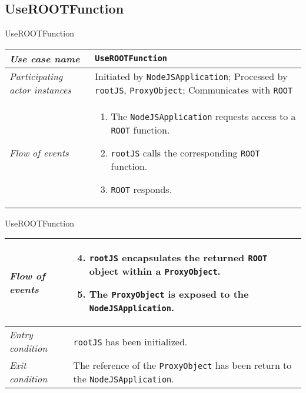 \subsection{UseROOTFunction}
\begin{frame}{UseROOTFunction}
        \begin{longtable}{p{3cm} @{\hskip 1cm} p{7cm}}
                \hline

                \textit{Use case name} & \texttt{UseROOTFunction}\\
                \hline

                \textit{Participating actor instances} & Initiated by \texttt{NodeJSApplication}; Processed by \texttt{rootJS}, \texttt{ProxyObject}; Communicates with \texttt{ROOT}\\
                \hline

                \textit{Flow of events} &
                        \begin{enumerate}
                                \item The \texttt{NodeJSApplication} requests access to a \texttt{ROOT} function.
                                \item \texttt{rootJS} calls the corresponding \texttt{ROOT} function.
                                \item \texttt{ROOT} responds.
                        \end{enumerate}
                        \\
        \end{longtable}
\end{frame}
\begin{frame}[t]{UseROOTFunction}
        \begin{longtable}{p{3cm} @{\hskip 1cm} p{7cm}}
                \textit{Flow of events} &
                        \begin{enumerate}
                                \setcounter{enumi}{3}
                                \item \texttt{rootJS} encapsulates the returned \texttt{ROOT} object within a \texttt{ProxyObject}.
                                \item The \texttt{ProxyObject} is exposed to the \texttt{NodeJSApplication}.
                        \end{enumerate}
                       \\
                \hline

                \textit{Entry condition} & \texttt{rootJS} has been initialized.\\
                \hline

                \textit{Exit condition} & The reference of the \texttt{ProxyObject} has been return to the \texttt{NodeJSApplication}.\\
                \hline
        \end{longtable}
\end{frame}

